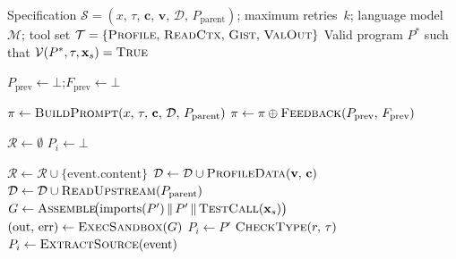 
\begin{algorithm}[t]
\caption{\textsc{Synthesize}: Tool-Augmented Code Synthesis with Iterative Refinement}
\label{alg:synthesize}
\begin{algorithmic}[1]

\Require Specification $\mathcal{S} = (x,\, \tau,\, \mathbf{c},\, \mathbf{v},\, \mathcal{D},\, P_{\mathrm{parent}})$;
  maximum retries~$k$; language model~$\mathcal{M}$;
  tool set $\mathcal{T} = \{\textsc{Profile},\, \textsc{ReadCtx},\, \textsc{Gist},\, \textsc{ValOut}\}$
\Ensure Valid program $P^{*}$ such that $\mathcal{V}(P^{*}, \tau, \mathbf{x}_s) = \textsc{True}$

\State $P_{\mathrm{prev}} \gets \bot$;\quad $F_{\mathrm{prev}} \gets \bot$


  \Statex \hspace{\algorithmicindent}
    \State $\pi \gets \textsc{BuildPrompt}(x,\, \tau,\, \mathbf{c},\, \mathcal{D},\, P_{\mathrm{parent}})$
  \Else
    \State $\pi \gets \pi \oplus \textsc{Feedback}(P_{\mathrm{prev}},\, F_{\mathrm{prev}})$
  \EndIf

  \Statex \hspace{\algorithmicindent}
  \State $\mathcal{R} \gets \emptyset$
  \State $P_i \gets \bot$

      \State $\mathcal{R} \gets \mathcal{R} \cup \{\text{event.content}\}$
      \State $\mathcal{D} \gets \mathcal{D} \cup \textsc{ProfileData}(\mathbf{v},\, \mathbf{c})$
      \State $\mathcal{D} \gets \mathcal{D} \cup \textsc{ReadUpstream}(P_{\mathrm{parent}})$
      \State $G \gets \textsc{Assemble}\!\bigl(\mathrm{imports}(P') \,\|\, P' \,\|\, \textsc{TestCall}(\mathbf{x}_s)\bigr)$
      \State $(\mathrm{out},\, \mathrm{err}) \gets \textsc{ExecSandbox}(G)$
      \State $P_i \gets P'$
      \State $\textsc{CheckType}(r,\, \tau)$
      \State $P_i \gets \textsc{ExtractSource}(\text{event})$
    \EndIf
  \EndFor


\end{algorithmic}
\end{algorithm}
